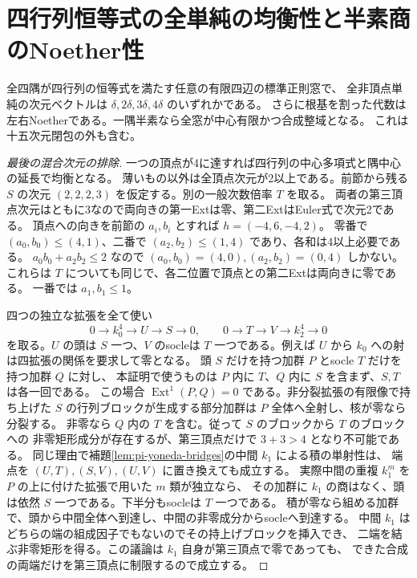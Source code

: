 \section{四行列恒等式の全単純の均衡性と半素商のNoether性}
\label{sec:four-matrix-balanced-simples}
\begin{theorem}\label{thm:four-matrix-balanced-simples}
全四隅が四行列の恒等式を満たす任意の有限四辺の標準正則窓で、
全非頂点単純の次元ベクトルは $\delta,2\delta,3\delta,4\delta$ のいずれかである。
さらに根基を割った代数は左右Noetherである。一隅半素なら全窓が中心有限かつ合成整域となる。
これは十五次元閉包の外も含む。
\end{theorem}
\begin{proof}[最後の混合次元の排除]
一つの頂点が4に達すれば四行列の中心多項式と隅中心の延長で均衡となる。
薄いもの以外は全頂点次元が2以上である。前節から残る
$S$ の次元 $(2,2,2,3)$ を仮定する。別の一般次数倍率 $T$ を取る。
両者の第三頂点次元はともに3なので両向きの第一Extは零、第二ExtはEuler式で次元2である。
頂点への向きを前節の $a_i,b_i$ とすれば $h=(-4,6,-4,2)$。
零番で $(a_0,b_0)\le(4,1)$、二番で $(a_2,b_2)\le(1,4)$ であり、各和は4以上必要である。
$a_0b_0+a_2b_2\le2$ なので $(a_0,b_0)=(4,0),(a_2,b_2)=(0,4)$ しかない。
これらは $T$ についても同じで、各二位置で頂点との第二Extは両向きに零である。
一番では $a_1,b_1\le1$。

四つの独立な拡張を全て使い
\[
 0\to k_0^4\to U\to S\to0,\qquad
 0\to T\to V\to k_2^4\to0
\]
を取る。$U$ の頭は $S$ 一つ、$V$ のsocleは $T$ 一つである。例えば $U$ から
$k_0$ への射は四拡張の関係を要求して零となる。
頭 $S$ だけを持つ加群 $P$ とsocle $T$ だけを持つ加群 $Q$ に対し、
本証明で使うものは $P$ 内に $T$、$Q$ 内に $S$ を含まず、$S,T$ は各一回である。
この場合 $\operatorname{Ext}^1(P,Q)=0$ である。非分裂拡張の有限像で持ち上げた
$S$ の行列ブロックが生成する部分加群は $P$ 全体へ全射し、核が零なら分裂する。
非零なら $Q$ 内の $T$ を含む。従って $S$ のブロックから $T$ のブロックへの
非零矩形成分が存在するが、第三頂点だけで $3+3>4$ となり不可能である。
同じ理由で補題\ref{lem:pi-yoneda-bridges}の中間 $k_1$ による積の単射性は、
端点を $(U,T),(S,V),(U,V)$ に置き換えても成立する。
実際中間の重複 $k_1^m$ を $P$ の上に付けた拡張で用いた $m$ 類が独立なら、
その加群に $k_1$ の商はなく、頭は依然 $S$ 一つである。下半分もsocleは $T$ 一つである。
積が零なら組める加群で、頭から中間全体へ到達し、中間の非零成分からsocleへ到達する。
中間 $k_1$ はどちらの端の組成因子でもないのでその持上げブロックを挿入でき、
二端を結ぶ非零矩形を得る。この議論は $k_1$ 自身が第三頂点で零であっても、
できた合成の両端だけを第三頂点に制限するので成立する。


\end{proof}
